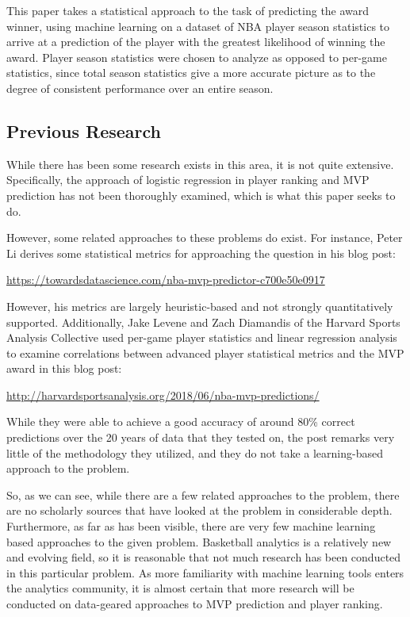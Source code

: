 \documentclass{article}
\begin{document}
This paper takes a statistical approach to the task of predicting the award winner, using machine learning on a dataset of NBA player season statistics to arrive at a prediction of the player with the greatest likelihood of winning the award. Player season statistics were chosen to analyze as opposed to per-game statistics, since total season statistics give a more accurate picture as to the degree of consistent performance over an entire season.

\subsection{Previous Research}

While there has been some research exists in this area, it is not quite extensive. Specifically, the approach of logistic regression in player ranking and MVP prediction has not been thoroughly examined, which is what this paper seeks to do.

However, some related approaches to these problems do exist. For instance, Peter Li derives some statistical metrics for approaching the question in his blog post:
\begin{center}
	\url{https://towardsdatascience.com/nba-mvp-predictor-c700e50e0917}
\end{center}

However, his metrics are largely heuristic-based and not strongly quantitatively supported. Additionally, Jake Levene and Zach Diamandis of the Harvard Sports Analysis Collective used per-game player statistics and linear regression analysis to examine correlations between advanced player statistical metrics and the MVP award in this blog post:
\begin{center}
	\url{http://harvardsportsanalysis.org/2018/06/nba-mvp-predictions/}
\end{center}

While they were able to achieve a good accuracy of around 80\% correct predictions over the 20 years of data that they tested on, the post remarks very little of the methodology they utilized, and they do not take a learning-based approach to the problem.

So, as we can see, while there are a few related approaches to the problem, there are no scholarly sources that have looked at the problem in considerable depth. Furthermore, as far as has been visible, there are very few machine learning based approaches to the given problem. Basketball analytics is a relatively new and evolving field, so it is reasonable that not much research has been conducted in this particular problem. As more familiarity with machine learning tools enters the analytics community, it is almost certain that more research will be conducted on data-geared approaches to MVP prediction and player ranking.
\end{document}
